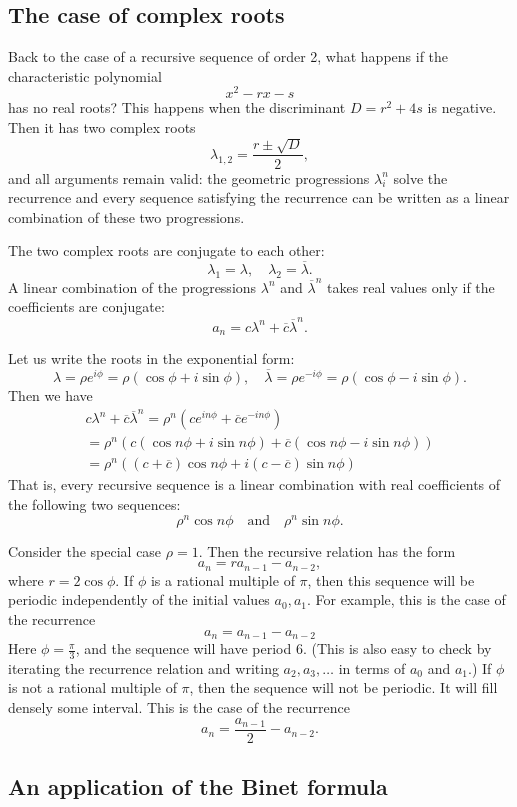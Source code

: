 \begin{page}

\subsection{The case of complex roots}
Back to the case of a recursive sequence of order 2, what happens if the characteristic polynomial
\[
x^2 - rx - s
\]
has no real roots? This happens when the discriminant $D = r^2 + 4s$ is negative.
Then it has two complex roots
\[
\lambda_{1,2} = \frac{r \pm \sqrt{D}}2,
\]
and all arguments remain valid: the geometric progressions $\lambda_i^n$ solve the recurrence and every sequence satisfying the recurrence
can be written as a linear combination of these two progressions.

The two complex roots are conjugate to each other:
\[
\lambda_1 = \lambda, \quad \lambda_2 = \overline{\lambda}.
\]
A linear combination of the progressions $\lambda^n$ and $\overline{\lambda}^n$ takes real values only if the coefficients are conjugate:
\[
a_n = c \lambda^n + \overline{c} \overline{\lambda}^n.
\]

Let us write the roots in the exponential form:
\[
\lambda = \rho e^{i\phi} = \rho (\cos\phi + i \sin\phi), \quad \overline{\lambda} = \rho e^{-i\phi} = \rho (\cos\phi - i\sin\phi).
\]
Then we have
\begin{multline*}
c \lambda^n + \overline{c} \overline{\lambda}^n
= \rho^n(ce^{in\phi} + \overline{c}e^{-in\phi})\\
= \rho^n(c(\cos n\phi + i\sin n\phi) + \overline{c}(\cos n\phi - i\sin n\phi))\\
= \rho^n((c+\overline{c}) \cos n\phi + i(c-\overline{c}) \sin n\phi)
\end{multline*}
That is, every recursive sequence is a linear combination with real coefficients of the following two sequences:
\[
\rho^n \cos n\phi \quad \text{and} \quad \rho^n \sin n\phi.
\]

Consider the special case $\rho = 1$.
Then the recursive relation has the form
\[
a_n = r a_{n-1} - a_{n-2},
\]
where $r = 2 \cos\phi$.
If $\phi$ is a rational multiple of $\pi$, then this sequence will be periodic independently of the initial values $a_0, a_1$.
For example, this is the case of the recurrence
\[
a_n = a_{n-1} - a_{n-2}
\]
Here $\phi = \frac{\pi}{3}$, and the sequence will have period $6$.
(This is also easy to check by iterating the recurrence relation and writing $a_2, a_3, \ldots$ in terms of $a_0$ and $a_1$.)
If $\phi$ is not a rational multiple of $\pi$, then the sequence will not be periodic.
It will fill densely some interval.
This is the case of the recurrence
\[
a_n = \frac{a_{n-1}}2 - a_{n-2}.
\]



\subsection{An application of the Binet formula}

\end{page}

